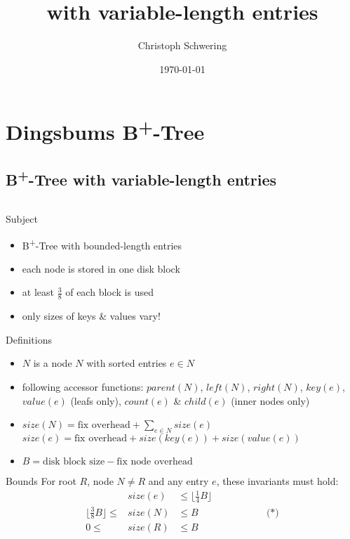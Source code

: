 \documentclass[mathserif]{beamer}
\title[Dingsbums \BTree]{\BTree with variable-length entries}
\author{Christoph Schwering}
\institute{RWTH Aachen}
\date{\today}
\newcommand \BTree { B\textsuperscript{+}-Tree }
\begin{document}
\section{Dingsbums \BTree}
\subsection{\BTree with variable-length entries}
\begin{frame}[t]{}
\begin{columns}[t]

\begin{column}{.27\linewidth}

    \begin{block}{Subject}
    \begin{itemize}
    \item \BTree with bounded-length entries
    \item each node is stored in one disk block
    \item at least $\tfrac{3}{8}$ of each block is used
    \item only sizes of keys \& values vary!
    \end{itemize}
    \end{block}

    \begin{block}{Definitions}
    \begin{itemize}
    \item $N$ is a node $N$ with sorted entries $e \in N$
    \item following accessor functions: $parent(N)$, $left(N)$, $right(N)$,
        $key(e)$, $value(e)$ (leafs only), $count(e)$ \& $child(e)$ (inner nodes
        only)
    \item $size(N) = \text{fix overhead} + \sum_{e \in N} size(e)$\\
        $size(e) = \text{fix overhead} + size(key(e)) + size(value(e))$\\
    \item $B = \text{disk block size} - \text{fix node overhead}$
    \end{itemize}
    \end{block}

    \begin{alertblock}{Bounds}
    For root $R$, node $N \neq R$ and any entry $e$, these invariants must hold:
    \[\begin{array}{rclr}
    & size(e) & \leq \lfloor \tfrac{1}{4} B \rfloor\\
    \lfloor \tfrac{3}{8} B \rfloor \leq & size(N) & \leq B
        & \hspace{2cm}\text{(*)}\\
    0 \leq & size(R) & \leq B
    \end{array}\]
    \end{alertblock}


\end{column}
\end{columns}
\end{frame}
\end{document}
